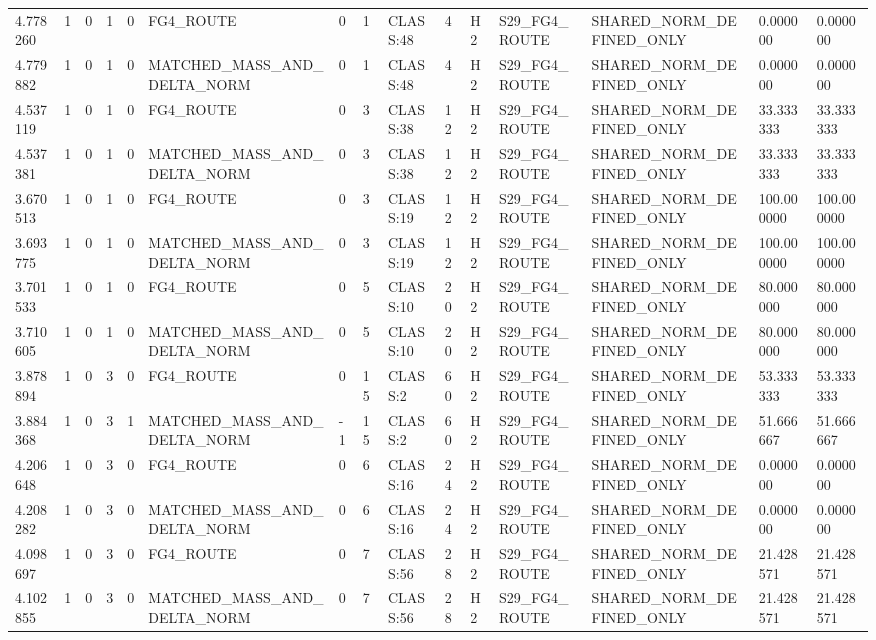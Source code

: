 \begin{tabular}{lllllllllllllll}
4.778260 & 1 & 0 & 1 & 0 & FG4\_ROUTE & 0 & 1 & CLASS:48 & 4 & H2 & S29\_FG4\_ROUTE & SHARED\_NORM\_DEFINED\_ONLY & 0.000000 & 0.000000 \\
4.779882 & 1 & 0 & 1 & 0 & MATCHED\_MASS\_AND\_DELTA\_NORM & 0 & 1 & CLASS:48 & 4 & H2 & S29\_FG4\_ROUTE & SHARED\_NORM\_DEFINED\_ONLY & 0.000000 & 0.000000 \\
4.537119 & 1 & 0 & 1 & 0 & FG4\_ROUTE & 0 & 3 & CLASS:38 & 12 & H2 & S29\_FG4\_ROUTE & SHARED\_NORM\_DEFINED\_ONLY & 33.333333 & 33.333333 \\
4.537381 & 1 & 0 & 1 & 0 & MATCHED\_MASS\_AND\_DELTA\_NORM & 0 & 3 & CLASS:38 & 12 & H2 & S29\_FG4\_ROUTE & SHARED\_NORM\_DEFINED\_ONLY & 33.333333 & 33.333333 \\
3.670513 & 1 & 0 & 1 & 0 & FG4\_ROUTE & 0 & 3 & CLASS:19 & 12 & H2 & S29\_FG4\_ROUTE & SHARED\_NORM\_DEFINED\_ONLY & 100.000000 & 100.000000 \\
3.693775 & 1 & 0 & 1 & 0 & MATCHED\_MASS\_AND\_DELTA\_NORM & 0 & 3 & CLASS:19 & 12 & H2 & S29\_FG4\_ROUTE & SHARED\_NORM\_DEFINED\_ONLY & 100.000000 & 100.000000 \\
3.701533 & 1 & 0 & 1 & 0 & FG4\_ROUTE & 0 & 5 & CLASS:10 & 20 & H2 & S29\_FG4\_ROUTE & SHARED\_NORM\_DEFINED\_ONLY & 80.000000 & 80.000000 \\
3.710605 & 1 & 0 & 1 & 0 & MATCHED\_MASS\_AND\_DELTA\_NORM & 0 & 5 & CLASS:10 & 20 & H2 & S29\_FG4\_ROUTE & SHARED\_NORM\_DEFINED\_ONLY & 80.000000 & 80.000000 \\
3.878894 & 1 & 0 & 3 & 0 & FG4\_ROUTE & 0 & 15 & CLASS:2 & 60 & H2 & S29\_FG4\_ROUTE & SHARED\_NORM\_DEFINED\_ONLY & 53.333333 & 53.333333 \\
3.884368 & 1 & 0 & 3 & 1 & MATCHED\_MASS\_AND\_DELTA\_NORM & -1 & 15 & CLASS:2 & 60 & H2 & S29\_FG4\_ROUTE & SHARED\_NORM\_DEFINED\_ONLY & 51.666667 & 51.666667 \\
4.206648 & 1 & 0 & 3 & 0 & FG4\_ROUTE & 0 & 6 & CLASS:16 & 24 & H2 & S29\_FG4\_ROUTE & SHARED\_NORM\_DEFINED\_ONLY & 0.000000 & 0.000000 \\
4.208282 & 1 & 0 & 3 & 0 & MATCHED\_MASS\_AND\_DELTA\_NORM & 0 & 6 & CLASS:16 & 24 & H2 & S29\_FG4\_ROUTE & SHARED\_NORM\_DEFINED\_ONLY & 0.000000 & 0.000000 \\
4.098697 & 1 & 0 & 3 & 0 & FG4\_ROUTE & 0 & 7 & CLASS:56 & 28 & H2 & S29\_FG4\_ROUTE & SHARED\_NORM\_DEFINED\_ONLY & 21.428571 & 21.428571 \\
4.102855 & 1 & 0 & 3 & 0 & MATCHED\_MASS\_AND\_DELTA\_NORM & 0 & 7 & CLASS:56 & 28 & H2 & S29\_FG4\_ROUTE & SHARED\_NORM\_DEFINED\_ONLY & 21.428571 & 21.428571 \\

\end{tabular}
